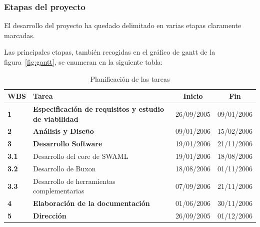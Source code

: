 \subsubsection{Etapas del proyecto}

El desarrollo del proyecto ha quedado delimitado en varias etapas claramente
marcadas.

Las principales etapas, también recogidas en el gráfico de gantt de la 
figura~\ref{fig:gantt}, se enumeran en la siguiente tabla:


\begin{table}[H]
 \begin{center}
  \begin{tabular}{|l|l|c|c|}
	\hline
	\textbf{WBS} & \textbf{Tarea} & \textbf{Inicio} & \textbf{Fin} \\
	\hline
	\textbf{1}   & \textbf{Especificación de requisitos y estudio de viabilidad} & 26/09/2005 & 09/01/2006 \\
	\hline
	\textbf{2}   & \textbf{Análisis y Diseño} & 09/01/2006 & 15/02/2006 \\
	\hline
	\textbf{3}   & \textbf{Desarrollo Software} & 19/01/2006 & 21/11/2006 \\
	\textbf{3.1} & Desarrollo del core de SWAML & 19/01/2006 & 18/08/2006 \\	
	\textbf{3.2} & Desarrollo de Buxon & 18/08/2006 & 01/11/2006 \\
	\textbf{3.3} & Desarrollo de herramientas complementarias & 07/09/2006 & 21/11/2006 \\	
	\hline
	\textbf{4}   & \textbf{Elaboración de la documentación} & 01/06/2006 & 30/11/2006 \\	
	\hline
	\textbf{5}   & \textbf{Dirección} & 26/09/2005 & 01/12/2006 \\
	\hline
  \end{tabular}
  \caption{Planificación de las tareas}
 \end{center}
\end{table}

